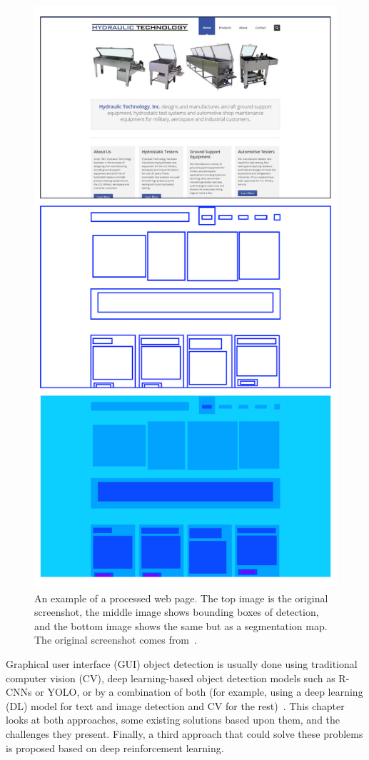 \documentclass[
  digital,     %
  oneside,     %
  nosansbold,  %
  nocolorbold, %
  lof,         %
  lot,         %
]{fithesis4}
\begin{document}
\begin{figure}
    \centering
    \includegraphics[width=0.7\linewidth]{diagrams/result_example.pdf}
    \caption{An example of a processed web page. The top image is the original screenshot, the middle image shows bounding boxes of detection, and the bottom image shows the same but as a segmentation map. The original screenshot comes from~\cite{aydos2020}.}
    \label{fig:example-result}
\end{figure}

Graphical user interface (GUI) object detection is usually done using traditional computer vision (CV), deep learning-based object detection models such as R-CNNs or YOLO, or by a combination of both (for example, using a deep learning (DL) model for text and image detection and CV for the rest)~\cite{ODforGUI_CV_DL_or_both}. This chapter looks at both approaches, some existing solutions based upon them, and the challenges they present. Finally, a third approach that could solve these problems is proposed based on deep reinforcement learning.
\end{document}
